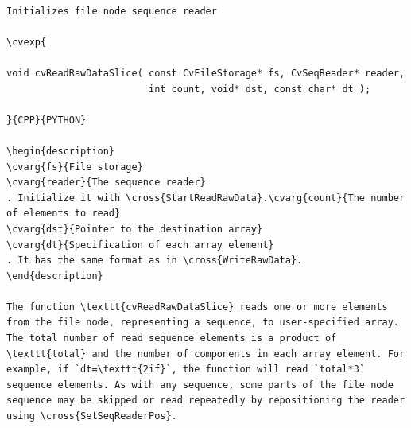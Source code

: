 \begin{verbatim}

Initializes file node sequence reader

\cvexp{

void cvReadRawDataSlice( const CvFileStorage* fs, CvSeqReader* reader,
                         int count, void* dst, const char* dt );

}{CPP}{PYTHON}

\begin{description}
\cvarg{fs}{File storage}
\cvarg{reader}{The sequence reader}
. Initialize it with \cross{StartReadRawData}.\cvarg{count}{The number of elements to read}
\cvarg{dst}{Pointer to the destination array}
\cvarg{dt}{Specification of each array element}
. It has the same format as in \cross{WriteRawData}.
\end{description}

The function \texttt{cvReadRawDataSlice} reads one or more elements from the file node, representing a sequence, to user-specified array. The total number of read sequence elements is a product of \texttt{total} and the number of components in each array element. For example, if `dt=\texttt{2if}`, the function will read `total*3` sequence elements. As with any sequence, some parts of the file node sequence may be skipped or read repeatedly by repositioning the reader using \cross{SetSeqReaderPos}.


\end{verbatim}
